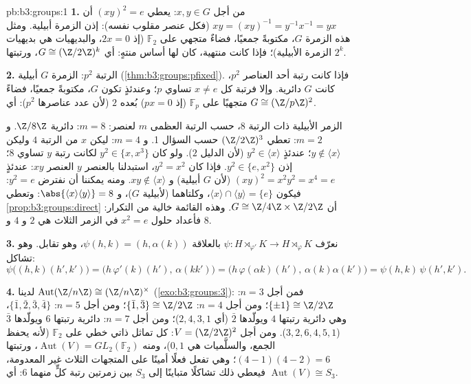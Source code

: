 \begin{solution}{pb:b3:groups:1}
\textbf{1.} من أجل $x, y \in G$: يعطي $(xy)^2 = e$ أن $xy = (xy)^{-1} =
y^{-1}x^{-1} = yx$
(فكل عنصر مقلوب نفسه): إذن الزمرة أبيلية. ومثل هذه الزمرة $G$،
مكتوبةً جمعيًا، فضاءٌ متجهي على $\mathbb
F_2$ (إذ $2x = 0$، والبديهيات
هي بديهيات الزمرة الأبيلية)؛ فإذا كانت منتهية، كان لها أساس
منتهٍ: أي $G \cong (\Z/2\Z)^k$، ورتبتها $2^k$.

\textbf{2.} الرتبة $p^2$: الزمرة $G$ أبيلية (\cref{thm:b3:groups:pfixed}). فإذا
كانت رتبة أحد العناصر $p^2$، كانت $G$ دائرية. وإلا فرتبة كل
$x \neq e$ تساوي $p$؛ وعندئذٍ تكون $G$، مكتوبةً جمعيًا، فضاءً
متجهيًا على $\mathbb F_p$ (إذ $px = 0$) بُعده $2$ (لأن عدد
عناصرها $p^2$): أي $G \cong (\Z/p\Z)^2$.

الزمر الأبيلية ذات الرتبة $8$، حسب الرتبة العظمى $m$ لعنصر:
$m =
8$: دائرية $\Z/8\Z$. و $m = 2$: تعطي $(\Z/2\Z)^3$ حسب
السؤال 1. و $m = 4$: ليكن $x$ من الرتبة $4$ وليكن $y \notin \langle x \rangle$؛ عندئذٍ
$y^2 \in
\langle x\rangle$ (لأن الدليل $2$). ولو كان $y^2 \in \{x, x^3\}$ لكانت رتبة $y$ تساوي
$8$؛ إذن $y^2 \in \{e, x^2\}$. فإذا كان $y^2 = x^2$، استبدلنا بالعنصر $y$ العنصر
$xy$: عندئذٍ $(xy)^2 = x^2y^2 = x^4 = e$ (لأن $G$ أبيلية) و $xy \notin
\langle x\rangle$. ومنه يمكننا أن
نفترض $y^2 = e$: فيكون $\langle x
\rangle \cap \langle y \rangle = \{e\}$، وكلتاهما  (لأبيلية $G$)،
و $\abs{\langle x\rangle \langle y\rangle} = 8$: وتعطي \cref{prop:b3:groups:direct} أن $G \cong \Z/4\Z \times \Z/2\Z$. وهذه القائمة خالية من
التكرار: فأعداد حلول $x^2 = e$ في الزمر الثلاث هي $2$ و $4$
و $8$.

\textbf{3.} نعرّف $\psi \colon H \rtimes_{\varphi'} K \to H
\rtimes_{\varphi} K$ بالعلاقة $\psi(h, k) = (h, \alpha(k))$، وهو تقابل. وهو
تشاكل:
\[
\psi\bigl((h,k)(h',k')\bigr)
= \bigl(h\,\varphi'(k)(h'),\, \alpha(kk')\bigr)
= \bigl(h\,\varphi(\alpha k)(h'),\, \alpha(k)\alpha(k')\bigr)
= \psi(h,k)\,\psi(h',k').
\]

\textbf{4.} لدينا $\operatorname{Aut}(\Z/n\Z) \cong (\Z/n\Z)^\times$ (\cref{exo:b3:groups:3}): فمن أجل $n = 3$:
$\{\pm 1\} \cong \Z/2\Z$؛ ومن أجل $n = 4$: $\{\bar 1, \bar 3\} \cong \Z/2\Z$؛ ومن أجل $n = 5$: $\{\bar 1,
\bar 2, \bar 3, \bar 4\}$،
وهي دائرية رتبتها $4$ ويولّدها $\bar
2$ (أي $2, 4, 3, 1$)؛ ومن
أجل $n = 7$: دائرية رتبتها $6$ ويولّدها $\bar
3$ ($3, 2, 6, 4, 5, 1$). ومن
أجل $V = (\Z/2\Z)^2$: كل تماثل ذاتي خطي على $\mathbb F_2$ (لأنه
يحفظ الجمع، والسلَّميات هي $0,
1$)، ومنه $\operatorname{Aut}(V) = GL_2(\mathbb F_2)$، ورتبتها
$(4-1)(4-2) = 6$؛ وهي تفعل فعلًا أمينًا على المتجهات الثلاث غير
المعدومة، فيعطي ذلك تشاكلًا متباينًا إلى $S_3$ بين زمرتين رتبة
كلٍّ منهما $6$: أي $\operatorname{Aut}(V) \cong S_3$.


\end{solution}
